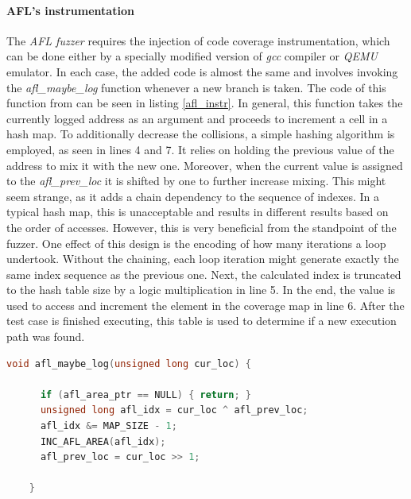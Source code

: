 \paragraph{AFL's instrumentation} \label{sec:aflinstr}
The \textit{AFL fuzzer} requires the injection of code coverage instrumentation, which can be done either by a specially modified version of \textit{gcc} compiler or \textit{QEMU} emulator. In each case, the added code is almost the same and involves invoking the \textit{afl\_maybe\_log} function whenever a new branch is taken. The code of this function from \cite{aflpprepo} can be seen in listing \ref{afl_instr}. In general, this function takes the currently logged address as an argument and proceeds to increment a cell in a hash map. To additionally decrease the collisions, a simple hashing algorithm is employed, as seen in lines 4 and 7. It relies on holding the previous value of the address to mix it with the new one. Moreover, when the current value is assigned to the \textit{afl\_prev\_loc} it is shifted by one to further increase mixing. This might seem strange, as it adds a chain dependency to the sequence of indexes. In a typical hash map, this is unacceptable and results in different results based on the order of accesses. However, this is very beneficial from the standpoint of the fuzzer. One effect of this design is the encoding of how many iterations a loop undertook. Without the chaining, each loop iteration might generate exactly the same index sequence as the previous one. Next, the calculated index is truncated to the hash table size by a logic multiplication in line 5. In the end, the value is used to access and increment the element in the coverage map in line 6. After the test case is finished executing, this table is used to determine if a new execution path was found.

\begin{minipage}\linewidth
    \begin{lstlisting}[language=C,caption={Instrumentation code from AFLPlusPlus fuzzer.},captionpos=b,label={afl_instr}]
    void afl_maybe_log(unsigned long cur_loc) {
    
      if (afl_area_ptr == NULL) { return; }
      unsigned long afl_idx = cur_loc ^ afl_prev_loc;
      afl_idx &= MAP_SIZE - 1;
      INC_AFL_AREA(afl_idx);
      afl_prev_loc = cur_loc >> 1;
    
    }
    \end{lstlisting}
\end{minipage}

